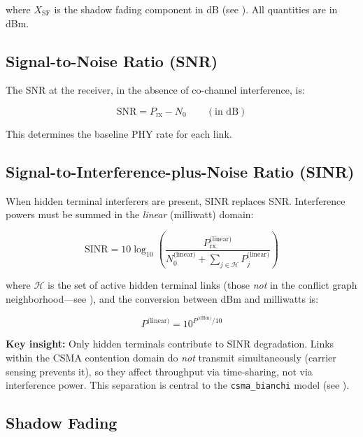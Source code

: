 \documentclass[11pt,letterpaper]{article}
\begin{document}
where $X_\text{SF}$ is the shadow fading component in dB (see
).  All quantities are in dBm.

\subsection{Signal-to-Noise Ratio (SNR)}
\label{sec:snr}

The SNR at the receiver, in the absence of co-channel interference, is:

\begin{equation}
\label{eq:snr}
\text{SNR} = P_\text{rx} - N_0 \qquad (\text{in dB})
\end{equation}

This determines the baseline PHY rate for each link.

\subsection{Signal-to-Interference-plus-Noise Ratio (SINR)}
\label{sec:sinr}

When hidden terminal interferers are present, SINR replaces SNR.
Interference powers must be summed in the \emph{linear} (milliwatt) domain:

\begin{equation}
\label{eq:sinr}
\text{SINR} = 10 \log_{10}\!\left(
  \frac{P_\text{rx}^\text{(linear)}}{N_0^\text{(linear)} + \sum_{j \in \mathcal{H}} P_j^\text{(linear)}}
\right)
\end{equation}

where $\mathcal{H}$ is the set of active hidden terminal links (those
\emph{not} in the conflict graph neighborhood---see ), and
the conversion between dBm and milliwatts is:

\begin{equation}
P^\text{(linear)} = 10^{P^\text{(dBm)}/10}
\end{equation}

\textbf{Key insight:} Only hidden terminals contribute to SINR degradation.
Links within the CSMA contention domain do \emph{not} transmit simultaneously
(carrier sensing prevents it), so they affect throughput via time-sharing, not
via interference power.  This separation is central to the
\texttt{csma\_bianchi} model (see ).

\subsection{Shadow Fading}
\label{sec:shadow}
\end{document}
